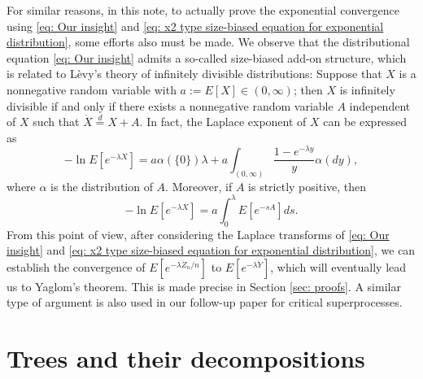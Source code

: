 \documentclass[ECP]{ejpecp} %
\begin{document}
For similar reasons,
in this note,
to actually prove the exponential convergence using \eqref{eq: Our insight} and \eqref{eq: x2 type size-biased equation for exponential distribution}, some efforts also must be made.
We observe that the distributional equation \eqref{eq: Our insight} admits
a so-called size-biased add-on structure, which is related to L\`evy's
theory of infinitely divisible distributions: Suppose that $X$ is a nonnegative random variable with
$ a := E [X]\in (0,\infty)$; then
$X$ is infinitely divisible if and only if there exists a nonnegative random variable $A$ independent of $X$ such that $\dot X 	\overset{d} = X + A$.
In fact,
the Laplace exponent of $X$ can be expressed as
\[
-\ln E[ e^{-\lambda X}]
=  a \alpha(\{0\}) \lambda+ a \int_{(0,\infty)} \frac{1 - e^{-\lambda y}}{y} \alpha(dy),
\]
where $\alpha$ is the distribution of $A$.
Moreover, if $A$ is strictly positive, then
\begin{equation}\label{eq: Laplace exponent for size-biased add-on equation}
-\ln E[ e^{-\lambda X}]
=  a  \int_0^\lambda E [e^{-s A}] ds.
\end{equation}
From this point of view, after considering the Laplace transforms of
\eqref{eq: Our insight} and \eqref{eq: x2 type size-biased equation for exponential distribution}, we can establish the convergence of $E[e^{-\lambda \dot Z_n/n}]$ to $E[e^{-\lambda \dot {Y}}]$, which will eventually lead us to Yaglom's theorem.
This is made precise in Section \ref{sec: proofs}.
A similar type of argument is also  used in our
follow-up
paper \cite{RenSongSun2017Spine} for critical superprocesses.

\section{Trees and their decompositions}
\label{sec:preliminary}
\end{document}
